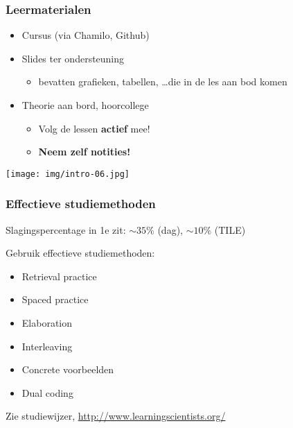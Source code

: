 \documentclass[aspectratio=169]{beamer}
\begin{document}
\begin{frame}
  \frametitle{Leermaterialen}

  \begin{itemize}
    \item Cursus (via Chamilo, Github)
    \item Slides ter ondersteuning
      \begin{itemize}
        \item bevatten grafieken, tabellen, \ldots die in de les aan bod komen
      \end{itemize}
    \item Theorie aan bord, hoorcollege
      \begin{itemize}
        \item Volg de lessen \textbf{actief} mee!
        \item \textbf{Neem zelf notities!}
      \end{itemize}
  \end{itemize}


  \begin{center}
    \texttt{[image: img/intro-06.jpg]}
  \end{center}

\end{frame}

\begin{frame}
  \frametitle{Effectieve studiemethoden}
  
  Slagingspercentage in 1e zit: $\sim35\%$ (dag), $\sim10\%$ (TILE)
  
  \vspace{8pt}
  
  Gebruik effectieve studiemethoden:
  
  \begin{itemize}
    \item Retrieval practice
    \item Spaced practice
    \item Elaboration
    \item Interleaving
    \item Concrete voorbeelden
    \item Dual coding
  \end{itemize}

  Zie studiewijzer, \url{http://www.learningscientists.org/}
  
\end{frame}
\end{document}
